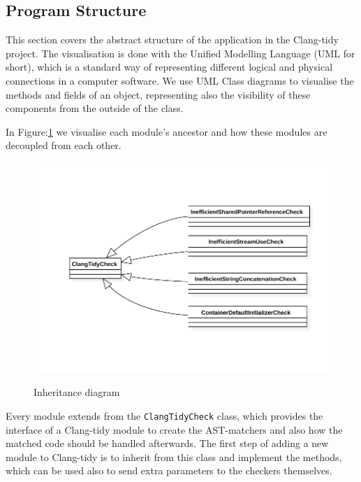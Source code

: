 \subsection{Program Structure}
\par This section covers the abstract structure of the application in the Clang-tidy project. The visualisation is done with the Unified Modelling Language (UML for short), which is a standard way of representing different logical and physical connections in a computer software. We use UML Class diagrams to visualise the methods and fields of an object, representing also the visibility of these components from the outside of the class.  \medskip
\par In Figure:\ref{inheritence} we visualise each module's ancestor and how these modules are decoupled from each other.
\begin{figure}[H]
 	\caption{Inheritance diagram}
 	\includegraphics[scale=1]{images/inheritence.pdf}
 	\label{inheritence}
\end{figure}
\par Every module extends from the \verb|ClangTidyCheck| class, which provides the interface of a Clang-tidy module to create the AST-matchers and also how the matched code should be handled afterwards. The first step of adding a new module to Clang-tidy is to inherit from this class and implement the methods, which can be used also to send extra parameters to the checkers themselves.
